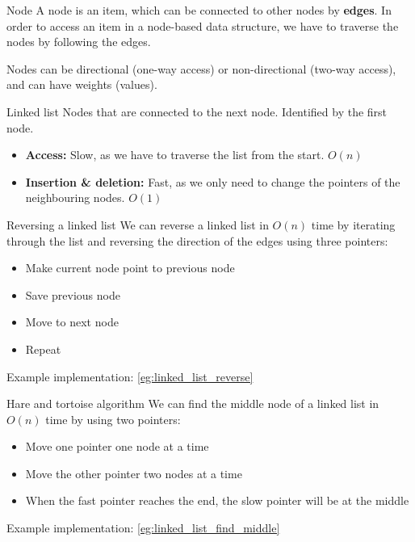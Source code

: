 \begin{knBox}
    {Node}
    A node is an item, which can be connected to other nodes by \textbf{edges}. In order to access an item in a node-based data structure, we have to traverse the nodes by following the edges.

    Nodes can be directional (one-way access) or non-directional (two-way access), and can have weights (values).
\end{knBox}

\begin{definition}
    {Linked list}
    Nodes that are connected to the next node. Identified by the first node.
    \begin{itemize}
        \item \textbf{Access:} Slow, as we have to traverse the list from the start. $O(n)$
        \item \textbf{Insertion \& deletion:} Fast, as we only need to change the pointers of the neighbouring nodes. $O(1)$
    \end{itemize}
\end{definition}

\begin{theorem}
    {Reversing a linked list}
    We can reverse a linked list in $O(n)$ time by iterating through the list and reversing the direction of the edges using three pointers:
    \begin{itemize}
        \item Make current node point to previous node
        \item Save previous node
        \item Move to next node
        \item Repeat
    \end{itemize}
    \tcblower
    Example implementation: \ref{eg:linked_list_reverse}
\end{theorem}
\label{thm:linked_list_reverse}

\begin{theorem}
    {Hare and tortoise algorithm}
    We can find the middle node of a linked list in $O(n)$ time by using two pointers:
    \begin{itemize}
        \item Move one pointer one node at a time
        \item Move the other pointer two nodes at a time
        \item When the fast pointer reaches the end, the slow pointer will be at the middle
    \end{itemize}
    \tcblower
    Example implementation: \ref{eg:linked_list_find_middle}
\end{theorem}
\label{thm:linked_list_find_middle}

